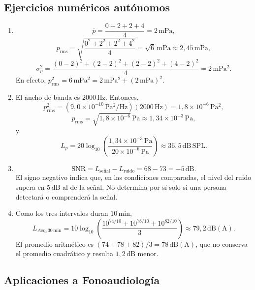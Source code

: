 \subsection*{Ejercicios numéricos autónomos}

\begin{enumerate}[label=\textbf{A\arabic*.},leftmargin=*]
    \item
    \[
        \overline p=\frac{0+2+2+4}{4}
        =2\,\mathrm{mPa},
    \]
    \[
        p_{\mathrm{rms}}
        =\sqrt{\frac{0^2+2^2+2^2+4^2}{4}}
        =\sqrt{6}\,\mathrm{mPa}
        \approx2{,}45\,\mathrm{mPa},
    \]
    \[
        \sigma_p^2
        =\frac{
        \left(0-2\right)^2+\left(2-2\right)^2+
        \left(2-2\right)^2+\left(4-2\right)^2}{4}
        =2\,\mathrm{mPa^2}.
    \]
    En efecto,
    \(p_{\mathrm{rms}}^2=6\,\mathrm{mPa^2}
    =2\,\mathrm{mPa^2}+\left(2\,\mathrm{mPa}\right)^2\).

    \item El ancho de banda es \(2000\,\mathrm{Hz}\). Entonces,
    \[
        p_{\mathrm{rms}}^2
        =\left(9{,}0\times10^{-10}\,\mathrm{Pa^2/Hz}\right)
        \left(2000\,\mathrm{Hz}\right)
        =1{,}8\times10^{-6}\,\mathrm{Pa^2},
    \]
    \[
        p_{\mathrm{rms}}
        =\sqrt{1{,}8\times10^{-6}}\,\mathrm{Pa}
        \approx1{,}34\times10^{-3}\,\mathrm{Pa},
    \]
    y
    \[
        L_p
        =20\log_{10}\left(
        \frac{1{,}34\times10^{-3}\,\mathrm{Pa}}
             {20\times10^{-6}\,\mathrm{Pa}}
        \right)
        \approx36{,}5\,\mathrm{dB\,SPL}.
    \]

    \item
    \[
        \mathrm{SNR}
        =L_{\text{señal}}-L_{\text{ruido}}
        =68-73=-5\,\mathrm{dB}.
    \]
    El signo negativo indica que, en las condiciones comparadas, el nivel del
    ruido supera en \(5\,\mathrm{dB}\) al de la señal. No determina por sí
    solo si una persona detectará o comprenderá la señal.

    \item Como los tres intervalos duran \(10\,\mathrm{min}\),
    \[
        L_{A\mathrm{eq},30\,\mathrm{min}}
        =10\log_{10}\left(
        \frac{10^{74/10}+10^{78/10}+10^{82/10}}{3}
        \right)
        \approx79{,}2\,\mathrm{dB(A)}.
    \]
    El promedio aritmético es
    \((74+78+82)/3=78\,\mathrm{dB(A)}\), que no conserva el promedio
    cuadrático y resulta \(1{,}2\,\mathrm{dB}\) menor.
\end{enumerate}

\subsection*{Aplicaciones a Fonoaudiología}


